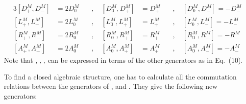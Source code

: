 \documentclass[a4paper,12pt]{article}
\begin{document}
\begin{alignat}{3}
[D_{+}^{M},D_{-}^{M}]&=2D_{0}^{M} & \quad, \quad [D_{0}^{M},
D_{+}^{M}]&=D_{+}^{M}
 & \quad, \quad [D_{0}^{M},D_{-}^{M}]=-D_{-}^{M} \\[0.2cm]
[L_{+}^{M},L_{-}^{M}]&=2L_{0}^{M} & \quad, \quad 
[L_{0}^{M},L_{+}^{M}]&=L_{+}^{M}
 & \quad, \quad [L_{0}^{M},L_{-}^{M}]=-L_{-}^{M} \\[0.2cm]
[R_{+}^{M},R_{-}^{M}]&=2R_{0}^{M} & \quad, \quad 
[R_{0}^{M},R_{+}^{M}]&=R_{+}^{M}
 & \quad, \quad [R_{0}^{M},R_{-}^{M}]=-R_{-}^{M} \\[0.2cm]
[A_{+}^{M},A_{-}^{M}]&=2A_{0}^{M} & \quad, \quad 
[A_{0}^{M},A_{+}^{M}]&=A_{+}^{M}
 & \quad, \quad [A_{0}^{M}, A_{-}^{M}]=-A_{-}^{M} 
\end{alignat}
Note that \coordHE{}, \coordHE{}, \coordHE{}, \coordHE{} can be  expressed 
in terms of the other generators as in Eq.~(10).

To find a closed algebraic structure, one has to calculate all the 
commutation relations between the generators of  \coordHE{}, \coordHE{} 
and \coordHE{}. They give the following new generators:
\end{document}
